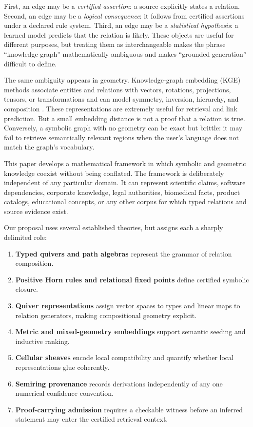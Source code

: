 \documentclass[11pt]{article}
\begin{document}
First, an edge may be a \emph{certified assertion}: a source explicitly states a relation. Second, an edge may be a \emph{logical consequence}: it follows from certified assertions under a declared rule system. Third, an edge may be a \emph{statistical hypothesis}: a learned model predicts that the relation is likely. These objects are useful for different purposes, but treating them as interchangeable makes the phrase ``knowledge graph'' mathematically ambiguous and makes ``grounded generation'' difficult to define.

The same ambiguity appears in geometry. Knowledge-graph embedding (KGE) methods associate entities and relations with vectors, rotations, projections, tensors, or transformations and can model symmetry, inversion, hierarchy, and composition \citep{bordes2013,trouillon2016,sun2019,li2024golde,yusupov2025}. These representations are extremely useful for retrieval and link prediction. But a small embedding distance is not a proof that a relation is true. Conversely, a symbolic graph with no geometry can be exact but brittle: it may fail to retrieve semantically relevant regions when the user's language does not match the graph's vocabulary.

This paper develops a mathematical framework in which symbolic and geometric knowledge coexist without being conflated. The framework is deliberately independent of any particular domain. It can represent scientific claims, software dependencies, corporate knowledge, legal authorities, biomedical facts, product catalogs, educational concepts, or any other corpus for which typed relations and source evidence exist.

Our proposal uses several established theories, but assigns each a sharply delimited role:
\begin{enumerate}[leftmargin=*]
    \item \textbf{Typed quivers and path algebras} represent the grammar of relation composition.
    \item \textbf{Positive Horn rules and relational fixed points} define certified symbolic closure.
    \item \textbf{Quiver representations} assign vector spaces to types and linear maps to relation generators, making compositional geometry explicit.
    \item \textbf{Metric and mixed-geometry embeddings} support semantic seeding and inductive ranking.
    \item \textbf{Cellular sheaves} encode local compatibility and quantify whether local representations glue coherently.
    \item \textbf{Semiring provenance} records derivations independently of any one numerical confidence convention.
    \item \textbf{Proof-carrying admission} requires a checkable witness before an inferred statement may enter the certified retrieval context.
\end{enumerate}
\end{document}

